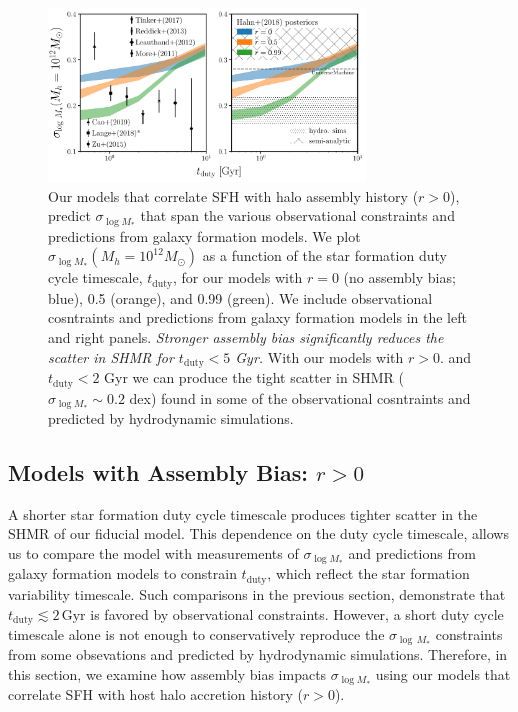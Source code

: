 \documentclass[12pt, letterpaper, preprint, tighten]{aastex62}
\newcommand{\edt}[1]{{\color{dred}{\bf} #1}}
\newcommand{\siglogm}{\sigma_{\log M_*}}
\begin{document}
\begin{figure}
\begin{center}
\includegraphics[width=0.75\textwidth]{figs/SHMRscatter_tduty_abias2.pdf}
    \caption{\edt{Our models that correlate SFH with halo assembly history ($r > 0$),
    predict $\siglogm$ that span the various observational constraints and predictions 
    from galaxy formation models.}
    We plot $\siglogm(M_h=10^{12}M_\odot)$ as a function of the star formation
    duty cycle timescale, $t_\mathrm{duty}$, for our
    \edt{models with $r = 0$ (no assembly bias; blue), 0.5 (orange), and 0.99 (green).
    We include observational cosntraints and predictions from galaxy formation models
    in the left and right panels.
    \emph{Stronger assembly bias significantly reduces the scatter in SHMR for
    $t_\mathrm{duty} < 5$ Gyr.}
    With our models with $r > 0.$ and $t_\mathrm{duty} < 2$ Gyr
    we can produce the tight scatter in SHMR ($\siglogm \sim 0.2$ dex) found in
    some of the observational cosntraints and predicted by hydrodynamic simulations}.
    }
\label{fig:sigMstar_duty_abias}
\end{center}
\end{figure}

\subsection{\edt{Models with Assembly Bias: $r > 0$}}
A shorter star formation duty cycle timescale produces tighter scatter in the
SHMR of our \edt{fiducial} model. This dependence on the duty cycle timescale,
allows us to compare the model with measurements of $\sigma_{\log M_*}$ and
predictions from galaxy formation models to constrain $t_\mathrm{duty}$, which
reflect the star formation variability timescale. Such comparisons in the previous
section, demonstrate that $t_\mathrm{duty} \lesssim 2\,\mathrm{Gyr}$ is
favored by observational constraints. However, a short duty cycle
timescale alone is not enough to conservatively reproduce the $\sigma_{\log\,M_*}$
\edt{constraints from some obsevations and predicted by hydrodynamic simulations.
Therefore, in this section, we examine how assembly bias impacts $\sigma_{\log M_*}$
using our models that correlate SFH with host halo accretion history ($r > 0$).}
\end{document}
